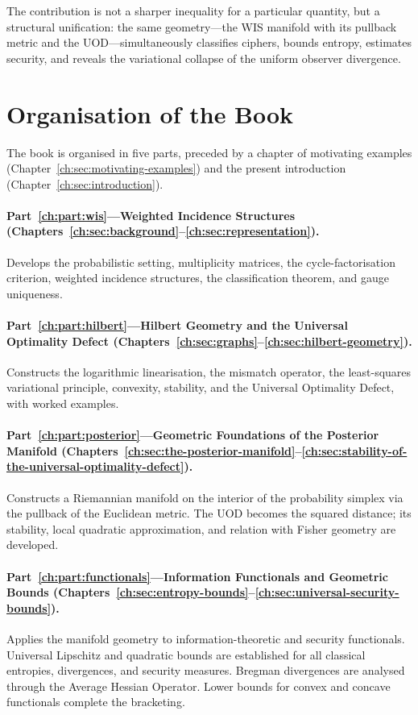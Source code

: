 The contribution is not a sharper inequality for a particular quantity,
but a structural unification: the same geometry---the WIS manifold with
its pullback metric and the UOD---simultaneously classifies ciphers,
bounds entropy, estimates security, and reveals the variational
collapse of the uniform observer divergence.

\section{Organisation of the Book}\label{ch:sec:organisation-of-the-book}

The book is organised in five parts, preceded by a chapter of
motivating examples (Chapter~\ref{ch:sec:motivating-examples}) and the present introduction
(Chapter~\ref{ch:sec:introduction}).

\paragraph{Part~\ref{ch:part:wis}---Weighted Incidence Structures (Chapters~\ref{ch:sec:background}--\ref{ch:sec:representation}).}
Develops the probabilistic setting, multiplicity matrices, the
cycle-factorisation criterion, weighted incidence structures, the
classification theorem, and gauge uniqueness.

\paragraph{Part~\ref{ch:part:hilbert}---Hilbert Geometry and the Universal Optimality
Defect (Chapters~\ref{ch:sec:graphs}--\ref{ch:sec:hilbert-geometry}).}
Constructs the logarithmic linearisation, the mismatch operator, the
least-squares variational principle, convexity, stability, and the
Universal Optimality Defect, with worked examples.

\paragraph{Part~\ref{ch:part:posterior}---Geometric Foundations of the Posterior Manifold
(Chapters~\ref{ch:sec:the-posterior-manifold}--\ref{ch:sec:stability-of-the-universal-optimality-defect}).}
Constructs a Riemannian manifold on the interior of the probability
simplex via the pullback of the Euclidean metric.  The UOD becomes the
squared distance; its stability, local quadratic approximation, and
relation with Fisher geometry are developed.

\paragraph{Part~\ref{ch:part:functionals}---Information Functionals and Geometric Bounds
(Chapters~\ref{ch:sec:entropy-bounds}--\ref{ch:sec:universal-security-bounds}).}
Applies the manifold geometry to information-theoretic and security
functionals.  Universal Lipschitz and quadratic bounds are established
for all classical entropies, divergences, and security measures.
Bregman divergences are analysed through the Average Hessian Operator.
Lower bounds for convex and concave functionals complete the bracketing.

